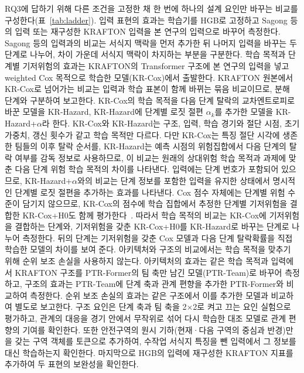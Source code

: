RQ3에 답하기 위해 다른 조건을 고정한 채 한 번에 하나의 설계 요인만 바꾸는 비교를 구성한다(표~\ref{tab:ladder}).
입력 표현의 효과는 학습기를 HGB로 고정하고 Sagong 등의 입력 또는 재구성한 KRAFTON 입력을 본 연구의 입력으로 바꾸어 측정한다.
Sagong 등의 입력과의 비교는 서식지 맥락을 먼저 추가한 뒤 나머지 입력을 바꾸는 두 단계로 나누어, 차이 가운데 서식지 맥락이 차지하는 부분을 구분한다.
학습 목적과 단계별 기저위험의 효과는 KRAFTON의 Transformer 구조에 본 연구의 입력을 넣고 weighted Cox 목적으로 학습한 모델(KR-Cox)에서 출발한다.
KRAFTON 원본에서 KR-Cox로 넘어가는 비교는 입력과 학습 표본이 함께 바뀌는 묶음 비교이므로, 분해 단계와 구분하여 보고한다.
KR-Cox의 학습 목적을 다음 단계 탈락의 교차엔트로피로 바꾼 모델을 KR-Hazard, KR-Hazard에 단계별 로짓 절편 $\alpha_k$를 추가한 모델을 KR-Hazard+$\alpha$라 한다.
KR-Cox와 KR-Hazard는 구조, 입력, 학습 경기와 절단 시점, 초기 가중치, 갱신 횟수가 같고 학습 목적만 다르다.
다만 KR-Cox는 특징 절단 시각에 생존한 팀들의 이후 탈락 순서를, KR-Hazard는 예측 시점의 위험집합에서 다음 단계의 탈락 여부를 감독 정보로 사용하므로, 이 비교는 원래의 상대위험 학습 목적과 과제에 맞춘 다음 단계 위험 학습 목적의 차이를 나타낸다.
입력에는 단계 번호가 포함되어 있으므로, KR-Hazard+$\alpha$와의 비교는 단계 정보를 포함한 입력을 유지한 상태에서 명시적인 단계별 로짓 절편을 추가하는 효과를 나타낸다.
Cox 점수 자체에는 단계별 위험 수준이 담기지 않으므로, KR-Cox의 점수에 학습 집합에서 추정한 단계별 기저위험을 결합한 KR-Cox+H0도 함께 평가한다~\cite{PrenticeGloeckler78}.
따라서 학습 목적의 비교는 KR-Cox에 기저위험을 결합하는 단계와, 기저위험을 갖춘 KR-Cox+H0를 KR-Hazard로 바꾸는 단계로 나누어 측정한다.
뒤의 단계는 기저위험을 갖춘 Cox 모델과 다음 단계 탈락확률을 직접 학습한 모델의 차이를 보여 준다.
아키텍처와 구조의 비교에서는 학습 목적을 맞추기 위해 순위 보조 손실을 사용하지 않는다.
아키텍처의 효과는 같은 학습 목적과 입력에서 KRAFTON 구조를 PTR-Former의 팀 축만 남긴 모델(PTR-Team)로 바꾸어 측정하고, 구조의 효과는 PTR-Team에 단계 축과 관계 편향을 추가한 PTR-Former와 비교하여 측정한다.
순위 보조 손실의 효과는 같은 구조에서 이를 추가한 모델과 비교하여 별도로 보고한다.
구조 요인은 단계 축과 팀 축을 2$\times$2로 켜고 끄는 요인 실험으로 평가하고, 관계의 대응을 경기 안에서 무작위로 섞어 다시 학습한 대조 모델로 관계 편향의 기여를 확인한다.
또한 안전구역의 원시 기하(현재·다음 구역의 중심과 반경)만을 갖는 구역 객체를 토큰으로 추가하여, 수작업 서식지 특징을 뺀 입력에서 그 정보를 대신 학습하는지 확인한다.
마지막으로 HGB의 입력에 재구성한 KRAFTON 지표를 추가하여 두 표현의 보완성을 확인한다.

